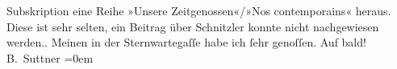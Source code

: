 \begin{ledgroupsized}[t]{13cm}
{{{                        Subskription eine Reihe »Unsere Zeitgenossen«/»Nos contemporains« heraus.
                        Diese ist sehr selten, ein Beitrag über Schnitzler konnte nicht nachgewiesen werden.}}}\label{K_L02156_2h}.\pend
           \pstart
           Meinen \label{K_L02156_3v}\label{K_L02156_3h} in der Sternwartegaſſe habe ich ſehr
                    genoſſen.\pend
           \pstart
           Auf bald!{\\[\baselineskip]}\spacefill\mbox{B. Suttner}\pend
           \leftskip=0em{}
         
         \endnumbering{}\end{ledgroupsized}  \newcommand{\dateiname}{L02156}\newcommand{\titel}{Bertha von Suttner an Arthur Schnitzler, 4. 11. 1913}\newcommand{\editorInnen}{Martin Anton Müller und Gerd-Hermann Susen}
      